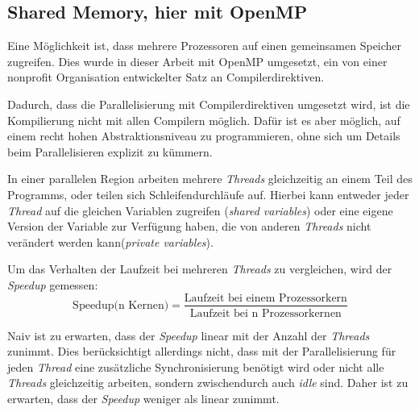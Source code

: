 	\subsection{Shared Memory, hier mit OpenMP}
	\label{subsec:openmptheorie}
	Eine Möglichkeit ist, dass mehrere Prozessoren auf einen gemeinsamen Speicher zugreifen\cite[vgl. ][S. 209]{pachecoparallel}. Dies wurde in dieser Arbeit mit OpenMP umgesetzt, ein von einer nonprofit Organisation entwickelter Satz an Compilerdirektiven\cite{specificationsopenmp}.
	
	Dadurch, dass die Parallelisierung mit Compilerdirektiven umgesetzt wird, ist die Kompilierung nicht mit allen Compilern möglich. Dafür ist es aber möglich, auf einem recht hohen Abstraktionsniveau zu programmieren, ohne sich um Details beim Parallelisieren explizit zu kümmern\cite[vgl. ][S. 209]{pachecoparallel}.	
	
	In einer parallelen Region arbeiten mehrere \textit{Threads} gleichzeitig an einem Teil des Programms, oder teilen sich Schleifendurchläufe auf. Hierbei kann entweder jeder \textit{Thread} auf die gleichen Variablen zugreifen (\textit{shared variables}) oder eine eigene Version der Variable zur Verfügung haben, die von anderen \textit{Threads} nicht verändert werden kann(\textit{private variables})\cite[vgl. ][S. 231 f.]{pachecoparallel}. 
	
	Um das Verhalten der Laufzeit bei mehreren \textit{Threads} zu vergleichen, wird der \textit{Speedup} gemessen:
	\begin{equation}
	\text{Speedup(n Kernen)}=\frac{\text{Laufzeit bei einem Prozessorkern}}{\text{Laufzeit bei n Prozessorkernen}}
	\label{eq:speedup}
	\end{equation}
	
	Naiv ist zu erwarten, dass der \textit{Speedup} linear mit der Anzahl der \textit{Threads} zunimmt. Dies berücksichtigt allerdings nicht, dass mit der Parallelisierung für jeden \textit{Thread} eine zusätzliche Synchronisierung benötigt wird oder nicht alle \textit{Threads} gleichzeitig arbeiten, sondern zwischendurch auch \textit{idle} sind. Daher ist zu erwarten, dass der \textit{Speedup} weniger als linear zunimmt\cite[vgl. ][S. 58 f.]{pachecoparallel}.
	
	
	
